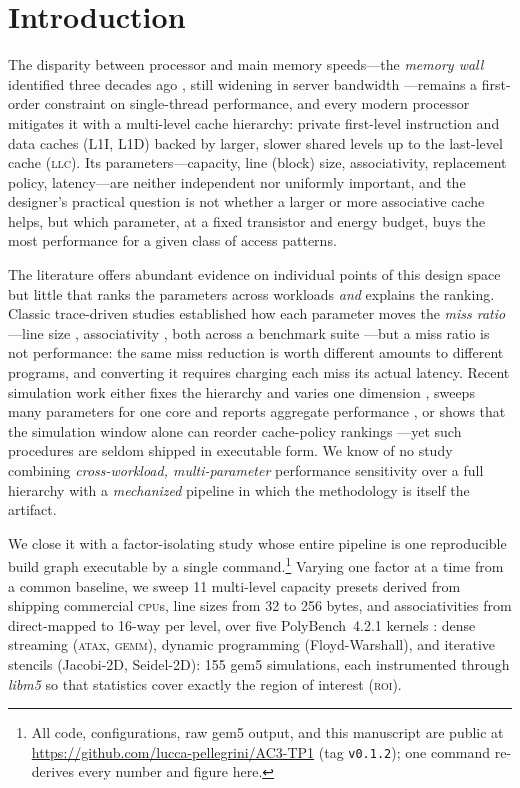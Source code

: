 \documentclass[12pt]{article}
\begin{document}
\section{Introduction}

The disparity between processor and main memory speeds---the \textit{memory wall}
identified three decades ago \cite{wulf:1995}, still widening in server
bandwidth \cite{gholami:2024}---remains a first-order constraint on
single-thread performance, and every modern processor mitigates it with a
multi-level cache hierarchy: private first-level instruction and data caches
(L1I, L1D) backed by larger, slower shared levels up to the last-level cache
(\textsc{llc}). Its parameters---capacity, line (block) size, associativity,
replacement policy, latency---are neither independent nor uniformly important,
and the designer's practical question is not whether a larger or more
associative cache helps, but which parameter, at a fixed transistor and energy
budget, buys the most performance for a given class of access patterns.

The literature offers abundant evidence on individual points of this design space
but little that ranks the parameters across workloads \textit{and} explains the
ranking. Classic trace-driven
studies established how each parameter moves the \textit{miss ratio}---line size
\cite{smith:1987}, associativity \cite{hill:1989}, both across a benchmark suite
\cite{cantin:2001}---but a miss ratio is not performance: the same miss reduction
is worth different amounts to different programs, and converting it requires
charging each miss its actual latency. Recent simulation work
either fixes the hierarchy and varies one dimension \cite{khoshavi:2018}, sweeps
many parameters for one core and reports aggregate performance
\cite{shahid:2025}, or shows that the simulation window alone can reorder
cache-policy rankings \cite{bueno:2024}---yet such procedures are seldom
shipped in executable form. We know of no study combining
\textit{cross-workload, multi-parameter} performance sensitivity over a full
hierarchy with a \textit{mechanized} pipeline in which the methodology is
itself the artifact.

We close it with a factor-isolating study whose entire pipeline is one
reproducible build graph executable by a single
command.\footnote{All code, configurations, raw gem5 output, and this manuscript
are public at \url{https://github.com/lucca-pellegrini/AC3-TP1} (tag
\texttt{v0.1.2}); one command re-derives every number and figure here.} Varying
one factor at a time from a common baseline, we sweep 11 multi-level capacity
presets derived from shipping commercial \textsc{cpu}s, line sizes from 32 to 256
bytes, and associativities from direct-mapped to 16-way per level, over five
PolyBench~4.2.1 kernels \cite{polybench:2016}: dense streaming (\textsc{ata}x,
\textsc{gemm}), dynamic programming (Floyd-Warshall), and iterative stencils
(Jacobi-2D, Seidel-2D): 155 gem5 \cite{gem5:2020} simulations, each
instrumented through \textit{libm5} so that statistics cover exactly the region
of interest (\textsc{roi}).
\end{document}
